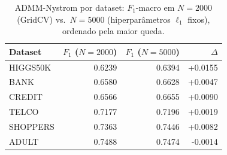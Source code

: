 \begin{table}[ht]
  \centering
  \caption[ADMM-Nyström por \textit{dataset}: $N{=}2000$ contra $N{=}5000$]{ADMM-Nystrom por dataset: $F_1$-macro em $N{=}2000$ (GridCV) vs.\ $N{=}5000$ (hiperparâmetros $\ell_1$ fixos), ordenado pela maior queda.}
  \label{tab:tier2_n5000_admm_collapse}
  \begin{tabular}{lrrr}
    \toprule
    Dataset & $F_1$ ($N{=}2000$) & $F_1$ ($N{=}5000$) & $\Delta$ \\
    \midrule
    HIGGS50K & 0.6239 & 0.6394 & +0.0155 \\
    BANK & 0.6580 & 0.6628 & +0.0047 \\
    CREDIT & 0.6566 & 0.6655 & +0.0090 \\
    TELCO & 0.7177 & 0.7196 & +0.0019 \\
    SHOPPERS & 0.7363 & 0.7446 & +0.0082 \\
    ADULT & 0.7488 & 0.7474 & -0.0014 \\
    \bottomrule
  \end{tabular}
\end{table}
